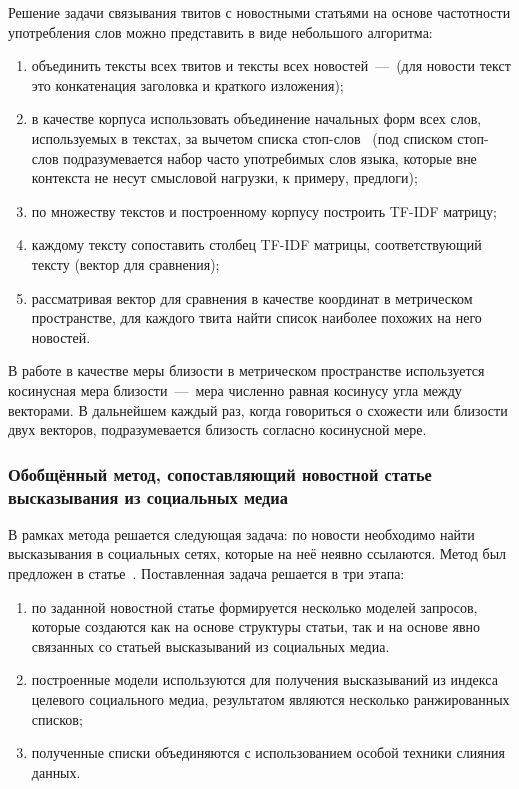         Решение задачи связывания твитов с новостными статьями на основе частотности употребления слов можно представить в виде небольшого алгоритма:
        \begin{enumerate}
            \item объединить тексты всех твитов и тексты всех новостей~---~(для новости текст это конкатенация заголовка и краткого изложения);
            \item в качестве корпуса использовать объединение начальных форм всех слов, используемых в текстах, за вычетом списка стоп-слов~
            (под списком стоп-слов подразумевается набор часто употребимых слов языка, которые вне контекста не несут смысловой нагрузки, к примеру, предлоги);
            \item по множеству текстов и построенному корпусу построить TF-IDF матрицу;
            \item каждому тексту сопоставить столбец TF-IDF матрицы, соответствующий тексту (вектор для сравнения);
            \item рассматривая вектор для сравнения в качестве координат в метрическом пространстве, для каждого твита найти список наиболее похожих на него новостей.
        \end{enumerate}

        В работе в качестве меры близости в метрическом пространстве используется косинусная мера близости~---~мера численно равная косинусу угла между векторами.
        В дальнейшем каждый раз, когда говориться о схожести или близости двух векторов, подразумевается близость согласно косинусной мере.

    \subsubsection{Обобщённый метод, сопоставляющий новостной статье высказывания из социальных медиа}
        В рамках метода решается следующая задача: по новости необходимо найти высказывания в социальных сетях, которые на неё неявно ссылаются.
        Метод был предложен в статье~\cite{linking_news_media}.
        Поставленная задача решается в три этапа:
        \begin{enumerate}
            \item по заданной новостной статье формируется несколько моделей запросов, которые создаются как на основе структуры статьи,
                так и на основе явно связанных со статьей высказываний из социальных медиа.
            \item построенные модели используются для получения высказываний из индекса целевого социального медиа, результатом являются несколько ранжированных списков;
            \item полученные списки объединяются с использованием особой техники слияния данных.
        \end{enumerate}

